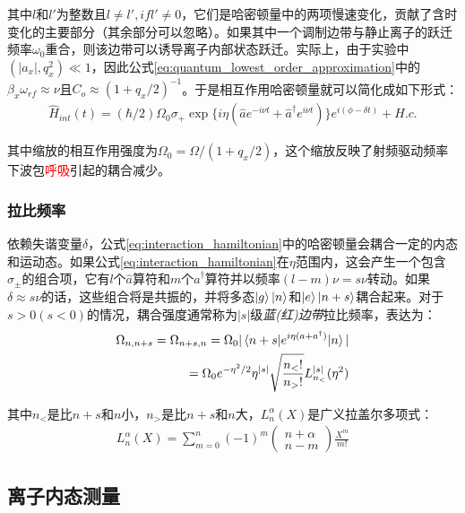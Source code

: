 其中$l$和$l'$为整数且$l\neq l', if l'\neq 0$，它们是哈密顿量中的两项慢速变化，贡献了含时变化的主要部分（其余部分可以忽略）。如果其中一个调制边带与静止离子的跃迁频率$\omega_0$重合，则该边带可以诱导离子内部状态跃迁。实际上，由于实验中$(|a_x|,q_x^2)\ll 1$，因此公式\eqref{eq:quantum_lowest_order_approximation}中的$\beta_x\omega_{rf}\approx\nu$且$C_o\approx(1+q_x/2)^{-1}$。于是相互作用哈密顿量就可以简化成如下形式：
\begin{align}
    \hat{H}_{int}(t)=(\hbar/2)\Omega_0\sigma_+ \exp\{i\eta(\hat{a}e^{-i\nu t}+\hat{a}^\dagger e^{i\nu t})\}e^{i(\phi-\delta t)}+ H.c. \label{eq:interaction_hamiltonian}
\end{align}

其中缩放的相互作用强度为$\Omega_0=\Omega/(1+q_x/2)$，这个缩放反映了射频驱动频率下波包\textcolor{red}{呼吸}引起的耦合减少。

\subsubsection[拉比频率]{拉比频率\label{section:rabi_frequency}}

依赖失谐变量$\delta$，公式\eqref{eq:interaction_hamiltonian}中的哈密顿量会耦合一定的内态和运动态。如果公式\eqref{eq:interaction_hamiltonian}在$\eta$范围内，这会产生一个包含$\sigma_{\pm}$的组合项，它有$l$个$\hat{a}$算符和$m$个$\hat{a}^\dagger$算符并以频率$(l-m)\nu=s\nu$转动。如果$\delta\approx s\nu$的话，这些组合将是共振的，并将多态$\ket{g}\ket{n}$和$\ket{e}\ket{n+s}$耦合起来。对于$s>0(s<0)$的情况，耦合强度通常称为$|s|$级\emph{蓝(红)边带}拉比频率，表达为\cite[]{Leibfried_Meekhof_King_Monroe_Itano_Wineland_2002, Beige_Bose_Braun_Huelga_Knight_Plenio_Vedral_2000}：
\begin{align}
    \Omega_{n,n+s}=\Omega_{n+s,n}=\Omega_0|\braket{n+s|e^{i\eta(a+a^\dagger)}|n}|\\
    =\Omega_0 e^{-\eta^2/2}\eta^{|s|}\sqrt{\frac{n_<!}{n_>!}}L_{n_<}^{|s|}(\eta^2)
\end{align}

其中$n_<$是比$n+s$和$n$小，$n_>$是比$n+s$和$n$大，$L_n^\alpha(X)$是广义拉盖尔多项式：
\begin{align}
    L_n^\alpha(X)=\sum_{m=0}^{n}(-1)^m\begin{pmatrix}
        n+\alpha \\ n-m
    \end{pmatrix}\frac{X^m}{m!}
\end{align}

\subsection[离子内态测量]{离子内态测量}

